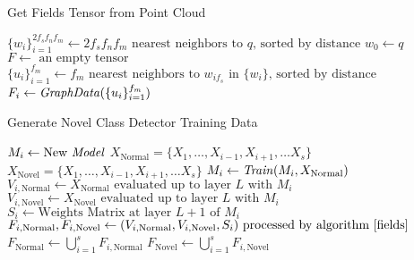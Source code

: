 \documentclass{article}
\begin{document}
\begin{algorithm}
\caption{Get Fields Tensor from Point Cloud}\label{fields}
\begin{algorithmic}[1]

\Procedure{}{}

\State $\{w_i\}_{i = 1}^{2 f_s f_n f_m} \gets  2 f_s f_n f_m \text{ nearest neighbors to } q \text{, sorted by distance}$
\State $w_0 \gets q$
\State $F \gets \text{ an empty tensor}$
\State $\{u_i\}_{i = 1}^{f_m} \gets f_m \text{ nearest neighbors to } w_{i f_s} \text{ in } \{w_i\} \text{, sorted by distance}$
\State $F_i \gets \text{\emph{GraphData}}(\{u_i\}_{i = 1}^{f_m})$

\EndFor
\EndProcedure
{}
\end{algorithmic}
\end{algorithm}


\begin{algorithm}
\caption{Generate Novel Class Detector Training Data}
\begin{algorithmic}[1]

\Procedure{}{}
\State $M_i \gets \text{New \emph{Model}}$
\State $X_\text{Normal} = \{X_1, \dots, X_{i-1}, X_{i+1}, \dots X_s\}$
\State $X_\text{Novel} = \{X_1, \dots, X_{i-1}, X_{i+1}, \dots X_s\}$
\State $M_i \gets \text{\emph{Train}}(M_i,X_{\text{Normal}})$
\State $V_{i,\text{Normal}} \gets X_\text{Normal} \text{ evaluated up to layer } L \text{ with } M_i$
\State $V_{i,\text{Novel}} \gets X_\text{Novel} \text{ evaluated up to layer } L \text{ with } M_i$
\State $S_i \gets \text{Weights Matrix at layer } L+1 \text{ of } M_i$
\State $F_{i,\text{Normal}},F_{i,\text{Novel}} \gets (V_{i,\text{Normal}},V_{i,\text{Novel}},S_i) \text{ processed by algorithm \ref{fields}}$
\EndFor
\State $F_{\text{Normal}} \gets \bigcup_{i=1}^s F_{i,\text{Normal}}$
\State $F_{\text{Novel}} \gets \bigcup_{i=1}^s F_{i,\text{Novel}}$
\EndProcedure
{}
\end{algorithmic}
\end{algorithm}



\end{document}
